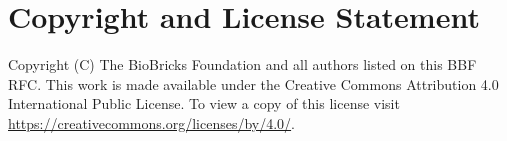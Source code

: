 \section{Copyright and License Statement}


Copyright (C) The BioBricks Foundation and all authors listed on this BBF RFC. This work is made available under the Creative Commons Attribution 4.0 International Public License. To view a copy of this license visit \href{https://creativecommons.org/licenses/by/4.0/}{https://creativecommons.org/licenses/by/4.0/}.
